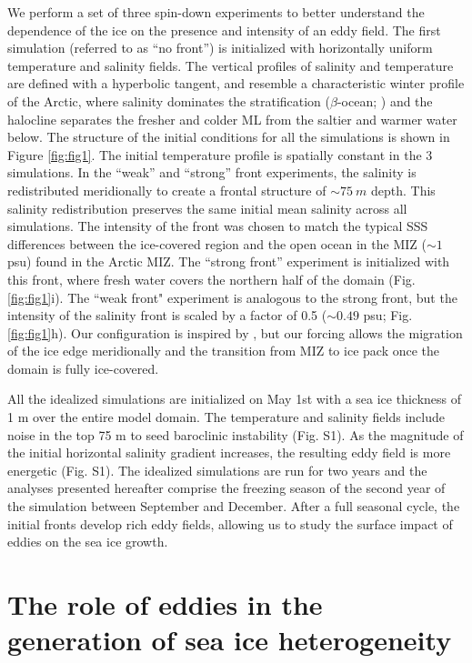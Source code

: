 \documentclass[draft]{agujournal2019}
\begin{document}
We perform a set of three spin-down experiments to better understand the dependence of the ice on the presence and intensity of an eddy field. The first simulation (referred to as ``no front'') is initialized with horizontally uniform temperature and salinity fields. The vertical profiles of salinity and temperature are defined with a hyperbolic tangent, and resemble a characteristic winter profile of the Arctic, where salinity dominates the stratification ($\beta$-ocean; \citealp{Carmack_beta_ocean_2007}) and the halocline separates the fresher and colder ML from the saltier and warmer water below.
The structure of the initial conditions for all the simulations is shown in Figure \ref{fig:fig1}. The initial temperature profile is spatially constant in the 3 simulations. In the ``weak'' and ``strong'' front experiments, the salinity is redistributed meridionally to create a frontal structure of $\sim75\ m$ depth. This salinity redistribution preserves the same initial mean salinity across all simulations. The intensity of the front was chosen to match the typical SSS differences between the ice-covered region and the open ocean in the MIZ ($\sim1$ psu) found in the Arctic MIZ. The ``strong front'' experiment is initialized with this front, where fresh water covers the northern half of the domain (Fig. \ref{fig:fig1}i).
The ``weak front" experiment is analogous to the strong front, but the intensity of the salinity front is scaled by a factor of 0.5 ($\sim0.49$ psu; Fig. \ref{fig:fig1}h). Our configuration is inspired by \citealt{Manucharyan_Ice_dynamics_2017}, but our forcing allows the migration of the ice edge meridionally and the transition from MIZ to ice pack once the domain is fully ice-covered.

All the idealized simulations are initialized on May 1st with a sea ice thickness of 1 m over the entire model domain. The temperature and salinity fields include noise in the top 75 m to seed baroclinic instability (Fig. S1). As the magnitude of the initial horizontal salinity gradient increases, the resulting eddy field is more energetic (Fig. S1).
The idealized simulations are run for two years and the analyses presented hereafter comprise the freezing season of the second year of the simulation between September and December. After a full seasonal cycle, the initial fronts develop rich eddy fields, allowing us to study the surface impact of eddies on the sea ice growth. 

\section{The role of eddies in the generation of sea ice heterogeneity}\label{subsec2}
\end{document}
